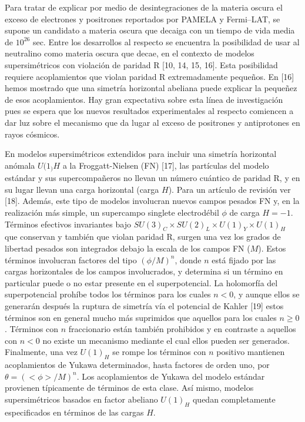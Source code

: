 Para tratar de explicar por medio de desintegraciones de la materia oscura el exceso de 
electrones y positrones reportados por PAMELA y Fermi–LAT, se supone un candidato a 
materia oscura que decaiga con un tiempo de vida media de $10^26$ sec. Entre los desarrollos 
al respecto se encuentra la posibilidad de usar al neutralino como materia oscura que decae, 
en el contexto de modelos supersimétricos con violación de paridad R [10, 14, 15, 16]. 
Esta posibilidad requiere acoplamientos que violan paridad R extremadamente pequeños. 
En [16] hemos mostrado que una simetría horizontal abeliana puede explicar la pequeñez 
de esos acoplamientos. Hay gran expectativa sobre esta línea de investigación pues se 
espera que los nuevos resultados experimentales al respecto comiencen a dar luz sobre 
el mecanismo que da lugar al exceso de positrones y antiprotones en rayos cósmicos.

En modelos supersimétricos extendidos para incluir una simetría horizontal anómala $U(1_)H$ 
a la Froggatt-Nielsen (FN) [17], las partículas del modelo estándar y sus supercompañeros no 
llevan un número cuántico de paridad R, y en su lugar llevan una carga horizontal (carga $H$). 
Para un artículo de revisión ver [18]. Además, este tipo de modelos involucran nuevos campos 
pesados FN y, en la realización más simple, un supercampo singlete electrodébil $\phi$ de carga $H = -1$. 
Términos efectivos invariantes bajo $SU(3)_C\times SU(2)_L\times U(1)_Y\times U(1)_H$  que conservan y también 
que violan paridad R, surgen una vez los grados de libertad pesados son integrados debajo la 
escala de los campos FN ($M$). Estos términos involucran factores del tipo $(\phi/M)^n$, donde $n$ está 
fijado  por las cargas horizontales de los campos involucrados, y determina si un término en 
particular puede o no estar presente en el superpotencial. La holomorfía del superpotencial 
prohíbe todos los términos para los cuales $n < 0$, y aunque ellos se generarán después la 
ruptura de simetría vía el potencial de Kahler [19] estos términos son en general mucho 
más suprimidos que aquellos para los cuales $n \geq 0$. Términos con $n$ fraccionario están 
también prohibidos y en contraste a aquellos con $n < 0$ no existe un mecanismo mediante 
el cual ellos pueden ser generados. Finalmente, una vez $U(1)_H$ se rompe los términos 
con $n$ positivo mantienen acoplamientos de Yukawa determinados, hasta factores de orden uno, 
por $\theta=(<\phi>/M)^n$. Los acoplamientos de Yukawa del modelo estándar provienen típicamente 
de términos de esta clase. Así mismo, modelos supersimétricos basados en factor abeliano 
$U(1)_H$ quedan completamente especificados en términos de las cargas $H$.

